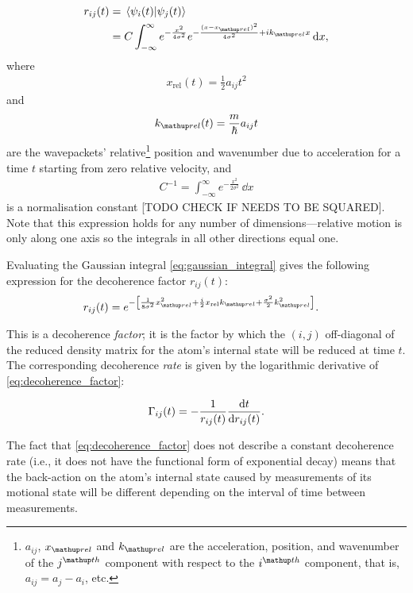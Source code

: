 \begin{align}
r_{ij}(t) &= \braket{\psi_i(t)}{\psi_j(t)}\\
 &= C \int_{-\infty}^{\infty} e^{-\frac{x^2}{4\sigma^2}}e^{-\frac{(x-x_\up{rel})^2}{4\sigma^2} + ik_\up{rel}x}\,\dd x,\label{eq:gaussian_integral}
\end{align}
where
\begin{align}
x_{\mathrm{rel}}(t) = \frac12a_{ij}t^2
\end{align}
and
\begin{align}
k_\up{rel}(t) = \frac m \hbar a_{ij} t
\end{align}
are the wavepackets' relative\footnote{$a_{ij}$, $x_\up{rel}$ and $k_\up{rel}$ are the acceleration, position, and wavenumber of the $j^\up{th}$ component with respect to the $i^\up{th}$ component, that is, $a_{ij} = a_j - a_i$, etc.} position and wavenumber due to acceleration for a time $t$ starting from zero relative velocity, and
\begin{align}
C^{-1}=\int_{-\infty}^\infty e^{-\frac{x^2}{2\sigma^2}}\,\dd x\label{supp:eq:Cdef}
\end{align}
is a normalisation constant [TODO CHECK IF NEEDS TO BE SQUARED]. Note that this expression holds for any number of dimensions---relative motion is only along one axis so the integrals in all other directions equal one.

Evaluating the Gaussian integral \eqref{eq:gaussian_integral} gives the following expression for the decoherence factor $r_{ij}(t)$:
\begin{align}
r_{ij}(t)&= e^{-\left[
        \frac{1} {8\sigma^2} x_\up{rel}^2
      + \frac i2 x_{\mathrm{rel}} k_\up{rel}
      + \frac{\sigma^2}{2} k_\up{rel}^2
      \right]}\label{eq:decoherence_factor}.
\end{align}

This is a decoherence \emph{factor}; it is the factor by which the $(i, j)$ off-diagonal of the reduced density matrix for the atom's internal state will be reduced at time $t$. The corresponding decoherence \emph{rate} is given by the logarithmic derivative of \eqref{eq:decoherence_factor}:

\begin{align}
\Gamma_{ij}(t) = - \frac 1 {r_{ij}(t)} \dv t {r_{ij}(t)}.
\end{align}

 The fact that \eqref{eq:decoherence_factor} does not describe a constant decoherence rate (i.e., it does not have the functional form of exponential decay) means that the back-action on the atom's internal state caused by measurements of its motional state will be different depending on the interval of time between measurements.

